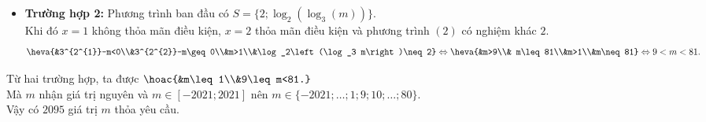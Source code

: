 \begin{ex}
{\begin{itemize}
		\item {\bf Trường hợp 2:} Phương trình ban đầu có $S=\{2;\log_2\left(\log_3(m)\right)\}$.\\
		Khi đó $x=1$ không thỏa mãn điều kiện, $x=2$ thỏa mãn điều kiện và phương trình $(2)$ có nghiệm khác $2$.
		\[\heva{&3^{2^{1}}-m<0\\&3^{2^{2}}-m\geq 0\\&m>1\\&\log_2\left(\log_3 m\right)\neq 2} \Leftrightarrow \heva{&m>9\\& m\leq 81\\&m>1\\&m\neq 81}\Leftrightarrow 9<m<81.\]
	\end{itemize}
	Từ hai trường hợp, ta được $\hoac{&m\leq 1\\&9\leq m<81.}$\\
	Mà $m$ nhận giá trị nguyên và $m\in[-2021;2021]$ nên $m\in\{-2021;\ldots;1;9;10;\ldots;80\}$.\\
	Vậy có $2095$ giá trị $m$ thỏa yêu cầu.
	}
\end{ex}

